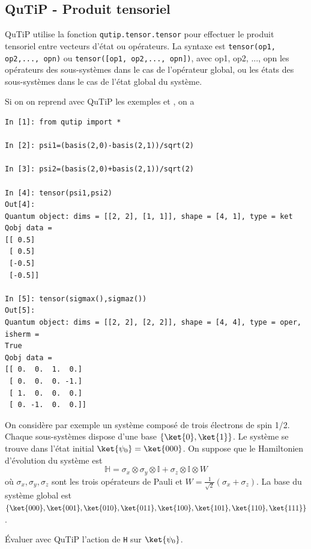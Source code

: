 \subsection{QuTiP - Produit tensoriel} 
\label{sec:tensor}

QuTiP utilise la fonction \texttt{qutip.tensor.tensor} pour effectuer le 
produit tensoriel entre vecteurs d'état ou opérateurs. La syntaxe est 
\texttt{tensor(op1, op2,..., opn)} ou \texttt{tensor([op1, op2,..., opn])}, 
avec op1, op2, ..., opn les opérateurs des sous-systèmes dans le cas 
de l'opérateur global, ou les états des sous-systèmes dans le cas de l'état 
global du système.

\begin{example}
 Si on on reprend avec QuTiP les exemples \label{expl:tensoEt} et 
\label{expl:tensoOt}, on a
\end{example}
\begin{lstlisting}
In [1]: from qutip import *

In [2]: psi1=(basis(2,0)-basis(2,1))/sqrt(2)

In [3]: psi2=(basis(2,0)+basis(2,1))/sqrt(2)

In [4]: tensor(psi1,psi2)
Out[4]: 
Quantum object: dims = [[2, 2], [1, 1]], shape = [4, 1], type = ket
Qobj data =
[[ 0.5]
 [ 0.5]
 [-0.5]
 [-0.5]]

In [5]: tensor(sigmax(),sigmaz())
Out[5]: 
Quantum object: dims = [[2, 2], [2, 2]], shape = [4, 4], type = oper, isherm = 
True
Qobj data =
[[ 0.  0.  1.  0.]
 [ 0.  0.  0. -1.]
 [ 1.  0.  0.  0.]
 [ 0. -1.  0.  0.]]
\end{lstlisting}

\begin{exercise}
On considère par exemple un système composé de trois électrons de spin 1/2. 
Chaque sous-systèmes dispose d'une base $\{\ket{0},\ket{1}\}$. Le système se 
trouve dans l'état initial $\ket{\psi_0}=\ket{000}$. On suppose que le 
Hamiltonien d'évolution du système est 
\begin{equation}
\mathbb{H} = 
\sigma_x\otimes\sigma_y\otimes\mathbb{I}+\sigma_z\otimes\mathbb{I}\otimes W
\end{equation}
où $\sigma_x,\sigma_y,\sigma_z$ sont les trois opérateurs de Pauli et 
$W=\frac{1}{\sqrt{2}}(\sigma_x+\sigma_z)$. La base du système global est 
$\{\ket{000},\ket{001},\ket{010},\ket{011},\ket{100},\ket{101},\ket{110},\ket{
111}\}$.

Évaluer avec QuTiP l'action de \texttt{H} sur $\ket{\psi_0}$.
\end{exercise}

